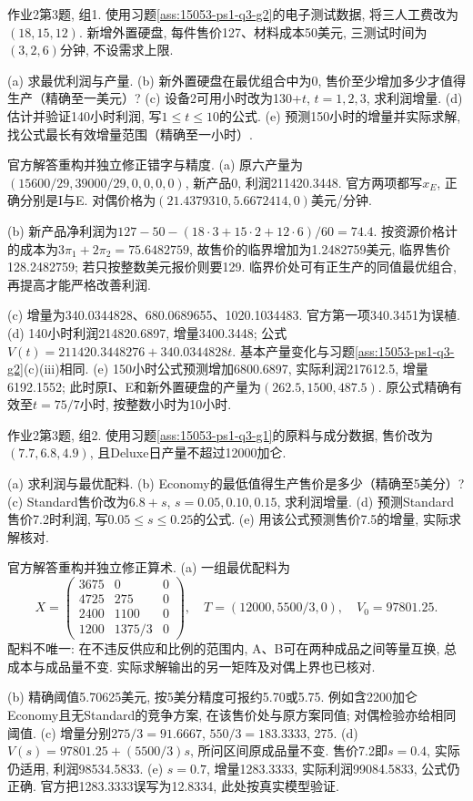 \begin{exercise}\label{ass:15053-ps2-q3-g1}
作业2第3题, 组1. 使用习题\ref{ass:15053-ps1-q3-g2}的电子测试数据, 将三人工费改为$(18,15,12)$. 新增外置硬盘, 每件售价127、材料成本50美元, 三测试时间为$(3,2,6)$分钟, 不设需求上限.

(a) 求最优利润与产量. (b) 新外置硬盘在最优组合中为0, 售价至少增加多少才值得生产（精确至一美元）? (c) 设备2可用小时改为130+$t$, $t=1,2,3$, 求利润增量. (d) 估计并验证140小时利润, 写$1\le t\le10$的公式. (e) 预测150小时的增量并实际求解, 找公式最长有效增量范围（精确至一小时）.
\end{exercise}
\begin{solution}
官方解答重构并独立修正错字与精度. (a) 原六产量为$(15600/29,39000/29,0,0,0,0)$, 新产品0, 利润211420.3448. 官方两项都写$x_E$, 正确分别是I与E. 对偶价格为$(21.4379310,5.6672414,0)$美元/分钟.

(b) 新产品净利润为$127-50-(18\cdot3+15\cdot2+12\cdot6)/60=74.4$. 按资源价格计的成本为$3\pi_1+2\pi_2=75.6482759$, 故售价的临界增加为1.2482759美元, 临界售价128.2482759; 若只按整数美元报价则要129. 临界价处可有正生产的同值最优组合, 再提高才能严格改善利润.

(c) 增量为340.0344828、680.0689655、1020.1034483. 官方第一项340.3451为误植. (d) 140小时利润214820.6897, 增量3400.3448; 公式$V(t)=211420.3448276+340.0344828t$. 基本产量变化与习题\ref{ass:15053-ps1-q3-g2}(c)(iii)相同. (e) 150小时公式预测增加6800.6897, 实际利润217612.5, 增量6192.1552; 此时原I、E和新外置硬盘的产量为$(262.5,1500,487.5)$. 原公式精确有效至$t=75/7$小时, 按整数小时为10小时.
\end{solution}

\begin{exercise}\label{ass:15053-ps2-q3-g2}
作业2第3题, 组2. 使用习题\ref{ass:15053-ps1-q3-g1}的原料与成分数据, 售价改为$(7.7,6.8,4.9)$, 且Deluxe日产量不超过12000加仑.

(a) 求利润与最优配料. (b) Economy的最低值得生产售价是多少（精确至5美分）? (c) Standard售价改为$6.8+s$, $s=0.05,0.10,0.15$, 求利润增量. (d) 预测Standard售价7.2时利润, 写$0.05\le s\le0.25$的公式. (e) 用该公式预测售价7.5的增量, 实际求解核对.
\end{exercise}
\begin{solution}
官方解答重构并独立修正算术. (a) 一组最优配料为
\[
X=\begin{pmatrix}3675&0&0\\4725&275&0\\2400&1100&0\\1200&1375/3&0\end{pmatrix},
\quad T=(12000,5500/3,0),\quad V_0=97801.25.
\]
配料不唯一: 在不违反供应和比例的范围内, A、B可在两种成品之间等量互换, 总成本与成品量不变. 实际求解输出的另一矩阵及对偶上界也已核对.

(b) 精确阈值5.70625美元, 按5美分精度可报约5.70或5.75. 例如含2200加仑Economy且无Standard的竞争方案, 在该售价处与原方案同值; 对偶检验亦给相同阈值. (c) 增量分别$275/3=91.6667$, $550/3=183.3333$, 275. (d) $V(s)=97801.25+(5500/3)s$, 所问区间原成品量不变. 售价7.2即$s=0.4$, 实际仍适用, 利润98534.5833. (e) $s=0.7$, 增量1283.3333, 实际利润99084.5833, 公式仍正确. 官方把1283.3333误写为12.8334, 此处按真实模型验证.
\end{solution}

